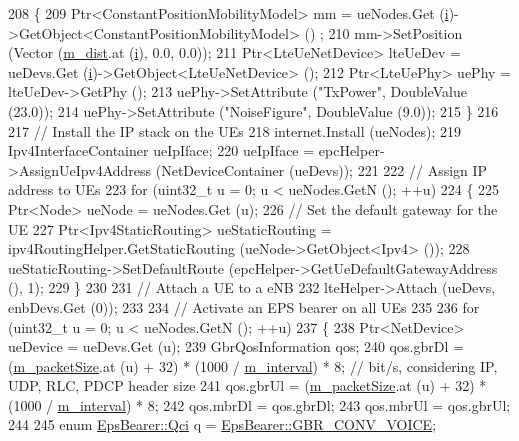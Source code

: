 \begin{DoxyCode}
208     \{
209       Ptr<ConstantPositionMobilityModel> mm = ueNodes.Get (\hyperlink{bernuolliDistribution_8m_a6f6ccfcf58b31cb6412107d9d5281426}{i})->GetObject<ConstantPositionMobilityModel> ()
      ;
210       mm->SetPosition (Vector (\hyperlink{classns3_1_1LenaDeactivateBearerTestCase_aa65554d27a1987eff686328a3441e8d0}{m\_dist}.at (\hyperlink{bernuolliDistribution_8m_a6f6ccfcf58b31cb6412107d9d5281426}{i}), 0.0, 0.0));
211       Ptr<LteUeNetDevice> lteUeDev = ueDevs.Get (\hyperlink{bernuolliDistribution_8m_a6f6ccfcf58b31cb6412107d9d5281426}{i})->GetObject<LteUeNetDevice> ();
212       Ptr<LteUePhy> uePhy = lteUeDev->GetPhy ();
213       uePhy->SetAttribute (\textcolor{stringliteral}{"TxPower"}, DoubleValue (23.0));
214       uePhy->SetAttribute (\textcolor{stringliteral}{"NoiseFigure"}, DoubleValue (9.0));
215     \}
216 
217   \textcolor{comment}{// Install the IP stack on the UEs}
218   internet.Install (ueNodes);
219   Ipv4InterfaceContainer ueIpIface;
220   ueIpIface = epcHelper->AssignUeIpv4Address (NetDeviceContainer (ueDevs));
221 
222   \textcolor{comment}{// Assign IP address to UEs}
223   \textcolor{keywordflow}{for} (uint32\_t u = 0; u < ueNodes.GetN (); ++u)
224     \{
225       Ptr<Node> ueNode = ueNodes.Get (u);
226       \textcolor{comment}{// Set the default gateway for the UE}
227       Ptr<Ipv4StaticRouting> ueStaticRouting = ipv4RoutingHelper.GetStaticRouting (ueNode->GetObject<Ipv4> 
      ());
228       ueStaticRouting->SetDefaultRoute (epcHelper->GetUeDefaultGatewayAddress (), 1);
229     \}
230 
231   \textcolor{comment}{// Attach a UE to a eNB}
232   lteHelper->Attach (ueDevs, enbDevs.Get (0));
233 
234   \textcolor{comment}{// Activate an EPS bearer on all UEs}
235 
236   \textcolor{keywordflow}{for} (uint32\_t u = 0; u < ueNodes.GetN (); ++u)
237     \{
238       Ptr<NetDevice> ueDevice = ueDevs.Get (u);
239       GbrQosInformation qos;
240       qos.gbrDl = (\hyperlink{classns3_1_1LenaDeactivateBearerTestCase_a0d6c5b51de98a92178ecaa55b4bfc9df}{m\_packetSize}.at (u) + 32) * (1000 / \hyperlink{classns3_1_1LenaDeactivateBearerTestCase_a9e0c220c5ffe150a033cff11146c620a}{m\_interval}) * 8;  \textcolor{comment}{// bit/s,
       considering IP, UDP, RLC, PDCP header size}
241       qos.gbrUl = (\hyperlink{classns3_1_1LenaDeactivateBearerTestCase_a0d6c5b51de98a92178ecaa55b4bfc9df}{m\_packetSize}.at (u) + 32) * (1000 / \hyperlink{classns3_1_1LenaDeactivateBearerTestCase_a9e0c220c5ffe150a033cff11146c620a}{m\_interval}) * 8;
242       qos.mbrDl = qos.gbrDl;
243       qos.mbrUl = qos.gbrUl;
244 
245       \textcolor{keyword}{enum} \hyperlink{structns3_1_1EpsBearer_aecf0c67109c5eb4ec0b07226fff5885e}{EpsBearer::Qci} q = \hyperlink{structns3_1_1EpsBearer_aecf0c67109c5eb4ec0b07226fff5885ea02ebd970315c3f749f5abac6e0c3e6d7}{EpsBearer::GBR\_CONV\_VOICE};

\end{DoxyCode}
